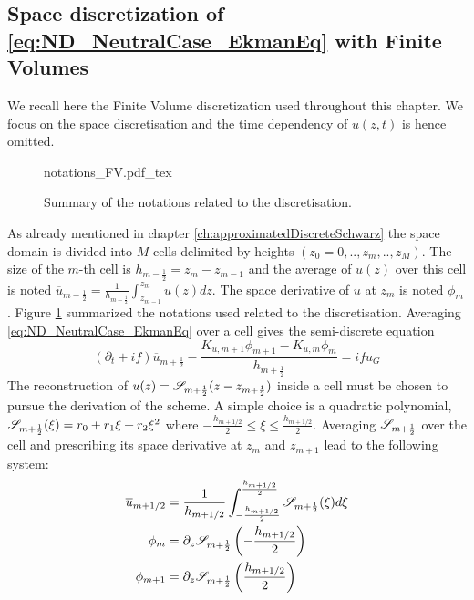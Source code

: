 \subsection{Space discretization of
\eqref{eq:ND_NeutralCase_EkmanEq} with Finite Volumes}
\label{sec:ND_NeutralCase_recallSplines}
We recall here the Finite Volume discretization used throughout
this chapter. We focus on the space discretisation and the time
dependency of $u(z, t)$ is hence omitted.
\begin{figure}[hb]
	\centering
	{notations_FV.pdf_tex}
	\caption{Summary of the notations related to the discretisation.}
	\label{fig:ND_NeutralCase_summary_notations}
\end{figure}
\par
As already mentioned in chapter \ref{ch:approximatedDiscreteSchwarz}
the space domain is divided into $M$ cells delimited by
heights $(z_0=0, .., z_m, .., z_M)$. The size of the $m$-th cell
is $h_{m-\frac{1}{2}}=z_{m}-z_{m-1}$ and the average of $u(z)$
over this cell is noted
$\overline{u}_{m-\frac{1}{2}}=\frac{1} {h_{m-\frac{1}{2}}}
\int_{z_{m-1}}^{z_m}u(z)dz$.
The space derivative of $u$ at $z_m$ is noted $\phi_{m}$.
Figure \ref{fig:ND_NeutralCase_summary_notations} summarized
the notations used related to the discretisation.
Averaging \eqref{eq:ND_NeutralCase_EkmanEq} over a cell gives
the semi-discrete equation
\begin{equation}
\label{eq:ND_NeutralCase_semiDiscreteEkmanEq}
	(\partial_t + if) \overline{u}_{m+\frac{1}{2}} - 
	\frac{K_{u, m+1} \phi_{m+1} - K_{u, m} \phi_{m}}
		{h_{m+\frac{1}{2}}} = i f u_G
\end{equation}
The reconstruction of $u(z) = {\cal S}_{m+\frac{1}{2}}
				(z - z_{m+\frac{1}{2}})$
				inside a cell must be chosen
to pursue the derivation of the scheme. A simple choice is
a quadratic polynomial,
${\cal S}_{m+\frac{1}{2}}(\xi) = r_0 + r_1 \xi + r_2 \xi^2$ where
$-\frac{h_{m+1/2}}{2} \leq \xi \leq \frac{h_{m+1/2}}{2}$.
Averaging ${\cal S}_{m+\frac{1}{2}}$ over the cell and
prescribing its space derivative at $z_{m}$ and $z_{m+1}$
lead to the following system:
\begin{equation}
	\begin{aligned}
		\overline{u}_{m+1/2} &= \frac{1}{h_{m+1/2}}
		\int_{-\frac{h_{m+1/2}}{2}}^{\frac{h_{m+1/2}}{2}}
		{\cal S}_{m+\frac{1}{2}}(\xi)d\xi\\
		\phi_m &= \partial_z {\cal S}_{m+\frac{1}{2}}
		\left(-\frac{h_{m+1/2}}{2}\right)\\
		\phi_{m+1} &=
		\partial_z {\cal S}_{m+\frac{1}{2}}
		\left(\frac{h_{m+1/2}}{2}\right)
	\end{aligned}
\end{equation}
